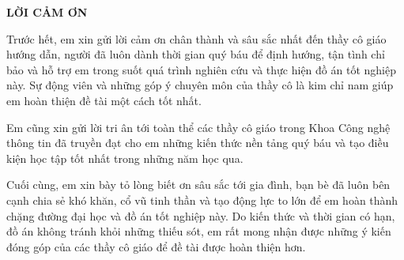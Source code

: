 \documentclass[../DoAn.tex]{subfiles}
\begin{document}
\begin{center}
    \Large{\textbf{LỜI CẢM ƠN}}\\
\end{center}
\vspace{1cm}

Trước hết, em xin gửi lời cảm ơn chân thành và sâu sắc nhất đến thầy cô giáo hướng dẫn, người đã luôn dành thời gian quý báu để định hướng, tận tình chỉ bảo và hỗ trợ em trong suốt quá trình nghiên cứu và thực hiện đồ án tốt nghiệp này. Sự động viên và những góp ý chuyên môn của thầy cô là kim chỉ nam giúp em hoàn thiện đề tài một cách tốt nhất.

Em cũng xin gửi lời tri ân tới toàn thể các thầy cô giáo trong Khoa Công nghệ thông tin đã truyền đạt cho em những kiến thức nền tảng quý báu và tạo điều kiện học tập tốt nhất trong những năm học qua. 

Cuối cùng, em xin bày tỏ lòng biết ơn sâu sắc tới gia đình, bạn bè đã luôn bên cạnh chia sẻ khó khăn, cổ vũ tinh thần và tạo động lực to lớn để em hoàn thành chặng đường đại học và đồ án tốt nghiệp này. Do kiến thức và thời gian có hạn, đồ án không tránh khỏi những thiếu sót, em rất mong nhận được những ý kiến đóng góp của các thầy cô giáo để đề tài được hoàn thiện hơn.
\end{document}

